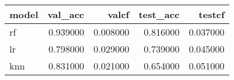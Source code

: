 \begin{tabular}{lrrrr}
\toprule
model & val_acc & valcf & test_acc & testcf \\
\midrule
rf & 0.939000 & 0.008000 & 0.816000 & 0.037000 \\
lr & 0.798000 & 0.029000 & 0.739000 & 0.045000 \\
knn & 0.831000 & 0.021000 & 0.654000 & 0.051000 \\
\bottomrule
\end{tabular}

